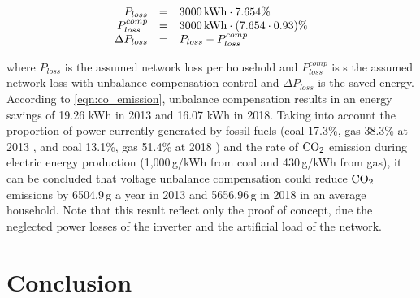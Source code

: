             \begin{equation}
                \label{eqn:co_emission}
                \begin{array}{rcl}
                 P_{loss}&=&3000\,\textnormal{kWh}\cdot7.654\%\\
                P^{comp}_{loss}&=&3000\,\textnormal{kWh}\cdot(7.654\cdot0.93)\%\\
                 \Delta P_{loss}&=&P_{loss}-P^{comp}_{loss}\\
                 \end{array}
                \end{equation}

            where $P_{loss}$ is the assumed network loss per household and $P^{comp}_{loss}$ is s the assumed network loss with unbalance compensation control and $\Delta P_{loss}$ is the saved energy. According to \ref{eqn:co_emission}, unbalance compensation results in an energy savings of 19.26 kWh in 2013 and 16.07 kWh in 2018. Taking into account the proportion of power currently generated by fossil fuels (coal 17.3\%, gas 38.3\% at 2013 \cite{MVM2013}, \cite{gorbe2012reduction} and coal 13.1\%, gas 51.4\% at 2018 \cite{MVM2018}) and the rate of $\textnormal{CO}_2$ emission during electric energy production (1,000\,g/kWh from coal and 430\,g/kWh from gas), it can be concluded that voltage unbalance compensation could reduce $\textnormal{CO}_2$ emissions by 6504.9\,g a year in 2013 and 5656.96\,g in 2018 in an average household. Note that this result reflect only the proof of concept, due the neglected power losses of the inverter and the artificial load of the network.
						

\section{Conclusion}\label{VUB:sec:Conclusion}

